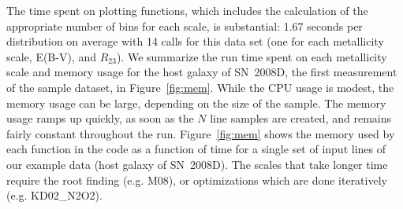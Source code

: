 \documentclass{emulateapj}
\begin{document}

The time spent on plotting functions, which includes the calculation of the appropriate number of bins for each scale, is substantial: 1.67 seconds per distribution on average with 14 calls for this data set (one for each metallicity scale, E(B-V), and $R_{23}$). 
We summarize the run time spent on each metallicity scale and memory usage for the host galaxy of SN~2008D, the first measurement of the sample dataset, in Figure~\ref{fig:mem}. While the CPU usage is modest, the memory usage can be large, depending on the size of the sample.  The memory usage ramps up quickly, as soon as the $N$ line samples are created, 
and remains fairly constant throughout the run.  Figure~\ref{fig:mem} shows the memory used by each function in the code as a function of time for a single set of input lines of our example data (host galaxy of SN~2008D). The scales that take longer time require the root finding (e.g. M08), or optimizations which are done iteratively (e.g. KD02\_N2O2).
\end{document}
